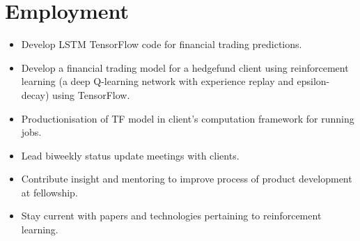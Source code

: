 \documentclass[11pt,a4paper,unicode]{moderncv}
\begin{document}
\vspace*{-6mm}
\maketitle
\vspace*{-6mm}

\section{Employment}


\vspace{-.1cm}
\cvline{}
{\begin{itemize} 
	  \item Develop LSTM TensorFlow code for financial trading predictions.
	  \item Develop a financial trading model for a hedgefund client using reinforcement learning (a deep Q-learning network with experience replay and epsilon-decay) using TensorFlow.
	  \item Productionisation of TF model in client's computation framework for running jobs.
	  \item Lead biweekly status update meetings with clients.
	  \item Contribute insight and mentoring to improve process of product development at fellowship.
	  \item Stay current with papers and technologies pertaining to reinforcement learning.
\end{itemize}}
\vspace{-.5cm}
\end{document}
